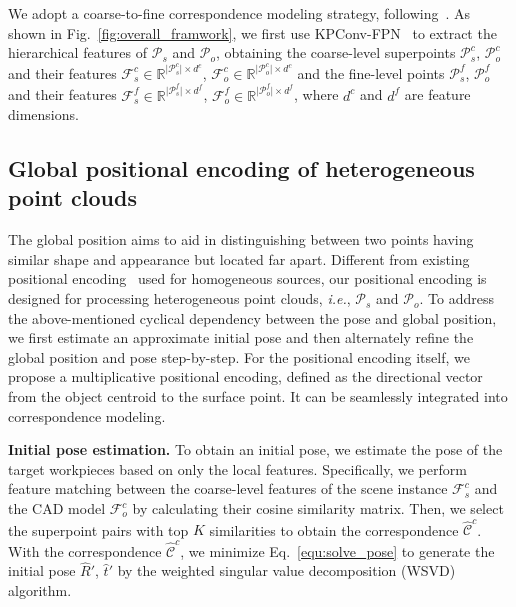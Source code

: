 We adopt a coarse-to-fine correspondence modeling strategy, following~\cite{qin2023geotransformer}. As shown in Fig.~\ref{fig:overall_framwork}, we first use KPConv-FPN~\cite{thomas2019kpconv} to extract the hierarchical features of $\mathcal{P}_s$ and $\mathcal{P}_o$, obtaining the coarse-level superpoints $\mathcal{P}^c_s$, $\mathcal{P}^c_o$ and their features $\mathcal{F}^c_s \in \mathbb{R}^{\lvert {\mathcal{P}^c_s} \vert \times d^c}$, $\mathcal{F}^c_o \in \mathbb{R}^{\lvert {\mathcal{P}^c_o} \vert \times d^c}$ and the fine-level points $\mathcal{P}^f_s$, $\mathcal{P}^f_o$ and their features $\mathcal{F}^f_s \in \mathbb{R}^{\lvert {\mathcal{P}^f_s} \vert \times d^f}$, $\mathcal{F}^f_o \in \mathbb{R}^{\lvert \mathcal{P}^f_o \vert \times d^f}$, where $d^c$ and $d^f$ are feature dimensions. 


\subsection{Global positional encoding of heterogeneous point clouds}
The global position aims to aid in distinguishing between two points having similar shape and appearance but located far apart. Different from existing positional encoding~\cite{transformer,qin2023geotransformer} used for homogeneous sources, our positional encoding is designed for processing heterogeneous point clouds, \emph{i.e.}, $\mathcal{P}_s$ and $\mathcal{P}_o$. To address the above-mentioned cyclical dependency between the pose and global position, we first estimate an approximate initial pose and then alternately refine the global position and pose step-by-step. For the positional encoding itself, we propose a multiplicative positional encoding, defined as the directional vector from the object centroid to the surface point. It can be seamlessly integrated into correspondence modeling.

\vspace{1mm}
\noindent\textbf{Initial pose estimation.}
To obtain an initial pose, we estimate the pose of the target workpieces based on only the local features. Specifically, we perform feature matching between the coarse-level features of the scene instance $\mathcal{F}_s^c$ and the CAD model $\mathcal{F}_o^c$ by calculating their cosine similarity matrix. Then, we select the superpoint pairs with top $K$ similarities to obtain the correspondence $\hat{\mathcal{C}}^c$. 
With the correspondence $\hat{\mathcal{C}}^c$, we minimize Eq.~\eqref{equ:solve_pose} to generate the initial pose $\hat{R}'$, $\hat{t}'$ by the weighted singular value decomposition (WSVD)~\cite{svd} algorithm.

